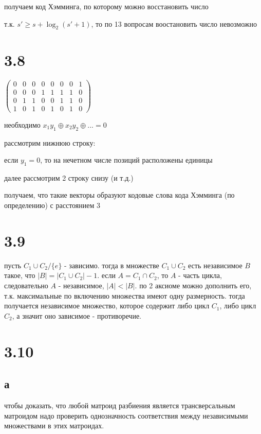 \documentclass[russian]{article}
\begin{document}
получаем код Хэмминга, по которому можно восстановить число

т.к. $s' \ge s + \log _2 (s' + 1)$, то по 13 вопросам воостановить число невозможно

\section*{3.8}

$\begin{pmatrix}
0 & 0 & 0 & 0 & 0 & 0 & 0 & 1 \\
0 & 0 & 0 & 1 & 1 & 1 & 1 & 0 \\
0 & 1 & 1 & 0 & 0 & 1 & 1 & 0 \\
1 & 0 & 1 & 0 & 1 & 0 & 1 & 0
\end{pmatrix}$

необходимо $x_1 y_1 \oplus x_2 y_2 \oplus ... = 0$

рассмотрим нижнюю строку:

если $y_1 = 0$, то на нечетном числе позиций расположены единицы

далее рассмотрим 2 строку снизу (и т.д.)

получаем, что такие векторы образуют кодовые слова кода Хэмминга (по определению) с расстоянием 3

\section*{3.9}

пусть $C_1 \cup C_2 / \{e\}$ - зависимо. тогда в множестве $C_1 \cup C_2$ есть независимое $B$ такое, что $|B|=|C_1 \cup C_2| - 1$. если $A=C_1 \cap C_2$, то $A$ - часть цикла, следовательно $A$ - независимое, $|A| < |B|$. по 2 аксиоме можно дополнить его, т.к. максимальные по включению множества имеют одну размерность. тогда получается независимое множество, которое содержит либо цикл $C_1$, либо цикл $C_2$, а значит оно зависимое - противоречие.

\section*{3.10}

\subsection*{а}

чтобы доказать, что любой матроид разбиения является трансверсальным матроидом надо проверить однозначность соответствия между независимыми множествами в этих матроидах. 
\end{document}
